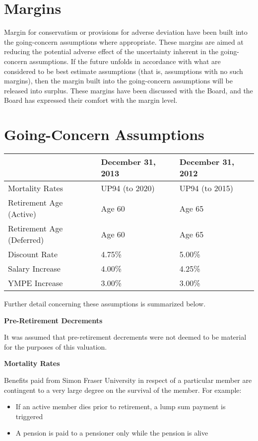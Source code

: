 \documentclass{report}
\begin{document}
\section{Margins}
Margin for conservatism or provisions for adverse deviation have been built into the going-concern assumptions where appropriate. These margins are aimed at reducing the potential adverse effect of the uncertainty inherent in the going-concern assumptions. If the future unfolds in accordance with what are considered to be best estimate assumptions (that is, assumptions with no such margins), then the margin built into the going-concern assumptions will be released into surplus. These margins have been discussed with the Board, and the Board has expressed their comfort with the margin level.

\section{Going-Concern Assumptions}

\vspace{3mm}
\bgroup
\normalsize
\def\arraystretch{1.5}
\begin{tabular}{p{4.5cm} p{5cm}  p{5cm}}
\hline
& \textbf{December 31, 2013 }& \textbf{December 31, 2012}  \\ \hline
Mortality Rates & UP94 (to 2020) & UP94 (to 2015) \\ \hline
Retirement Age (Active) & Age 60 & Age 65 \\ \hline
Retirement Age (Deferred) & Age 60 & Age 65 \\ \hline
Discount Rate & 4.75\% & 5.00\% \\ \hline
Salary Increase & 4.00\% & 4.25\% \\ \hline
YMPE Increase & 3.00\% & 3.00\% \\ \hline
\end{tabular}
\egroup

\vspace{3mm}
Further detail concerning these assumptions is summarized below.

\vspace{3mm}
\textbf{Pre-Retirement Decrements}

It was assumed that pre-retirement decrements were not deemed to be material for the purposes of this valuation.

\vspace{3mm}
\textbf{Mortality Rates}

Benefits paid from Simon Fraser University in respect of a particular member are contingent to a very large degree on the survival of the member. For example:
\begin{itemize}
\item If an active member dies prior to retirement, a lump sum payment is triggered
\item A pension is paid to a pensioner only while the pension is alive
\end{itemize}
\end{document}
